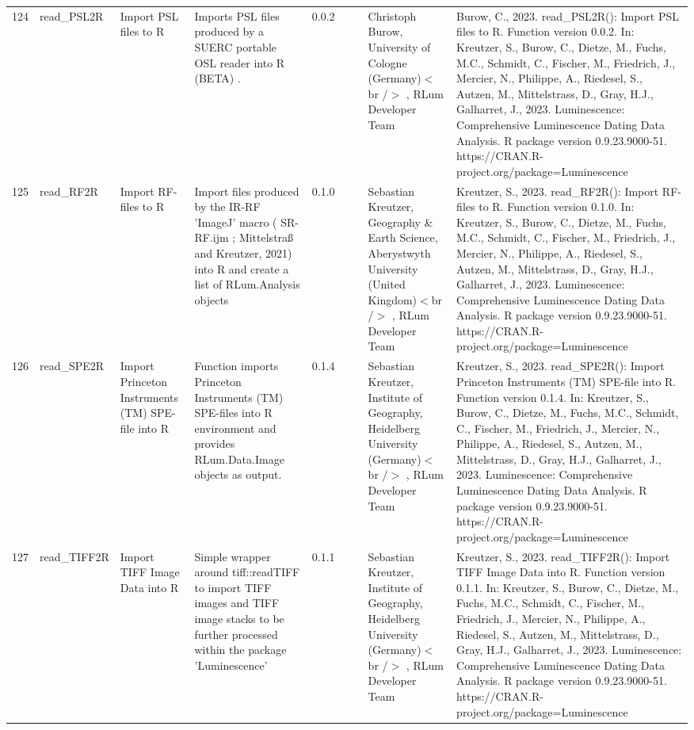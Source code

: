 \begin{table}[ht]
\begin{tabular}{rllllllll}
 \\ 
  124 & read\_PSL2R & Import PSL files to R & Imports PSL files produced by a SUERC portable OSL reader into R  (BETA) . & 0.0.2
 &  &  & Christoph Burow, University of Cologne (Germany)$<$br /$>$ , RLum Developer Team & Burow, C., 2023. read\_PSL2R(): Import PSL files to R. Function version 0.0.2. In: Kreutzer, S., Burow, C., Dietze, M., Fuchs, M.C., Schmidt, C., Fischer, M., Friedrich, J., Mercier, N., Philippe, A., Riedesel, S., Autzen, M., Mittelstrass, D., Gray, H.J., Galharret, J., 2023. Luminescence: Comprehensive Luminescence Dating Data Analysis. R package version 0.9.23.9000-51. https://CRAN.R-project.org/package=Luminescence
 \\ 
  125 & read\_RF2R & Import RF-files to R & Import files produced by the IR-RF 'ImageJ' macro ( SR-RF.ijm ; Mittelstraß and Kreutzer, 2021) into R and create a list of  RLum.Analysis  objects & 0.1.0
 &  &  & Sebastian Kreutzer, Geography \& Earth Science, Aberystwyth University (United Kingdom)$<$br /$>$ , RLum Developer Team & Kreutzer, S., 2023. read\_RF2R(): Import RF-files to R. Function version 0.1.0. In: Kreutzer, S., Burow, C., Dietze, M., Fuchs, M.C., Schmidt, C., Fischer, M., Friedrich, J., Mercier, N., Philippe, A., Riedesel, S., Autzen, M., Mittelstrass, D., Gray, H.J., Galharret, J., 2023. Luminescence: Comprehensive Luminescence Dating Data Analysis. R package version 0.9.23.9000-51. https://CRAN.R-project.org/package=Luminescence
 \\ 
  126 & read\_SPE2R & Import Princeton Instruments (TM) SPE-file into R & Function imports Princeton Instruments (TM) SPE-files into R environment and provides  RLum.Data.Image  objects as output. & 0.1.4
 &  &  & Sebastian Kreutzer, Institute of Geography, Heidelberg University (Germany)$<$br /$>$ , RLum Developer Team & Kreutzer, S., 2023. read\_SPE2R(): Import Princeton Instruments (TM) SPE-file into R. Function version 0.1.4. In: Kreutzer, S., Burow, C., Dietze, M., Fuchs, M.C., Schmidt, C., Fischer, M., Friedrich, J., Mercier, N., Philippe, A., Riedesel, S., Autzen, M., Mittelstrass, D., Gray, H.J., Galharret, J., 2023. Luminescence: Comprehensive Luminescence Dating Data Analysis. R package version 0.9.23.9000-51. https://CRAN.R-project.org/package=Luminescence
 \\ 
  127 & read\_TIFF2R & Import TIFF Image Data into R & Simple wrapper around  tiff::readTIFF  to import TIFF images and TIFF image stacks to be further processed within the package  'Luminescence' & 0.1.1
 &  &  & Sebastian Kreutzer, Institute of Geography, Heidelberg University (Germany)$<$br /$>$ , RLum Developer Team & Kreutzer, S., 2023. read\_TIFF2R(): Import TIFF Image Data into R. Function version 0.1.1. In: Kreutzer, S., Burow, C., Dietze, M., Fuchs, M.C., Schmidt, C., Fischer, M., Friedrich, J., Mercier, N., Philippe, A., Riedesel, S., Autzen, M., Mittelstrass, D., Gray, H.J., Galharret, J., 2023. Luminescence: Comprehensive Luminescence Dating Data Analysis. R package version 0.9.23.9000-51. https://CRAN.R-project.org/package=Luminescence

\end{tabular}
\end{table}
